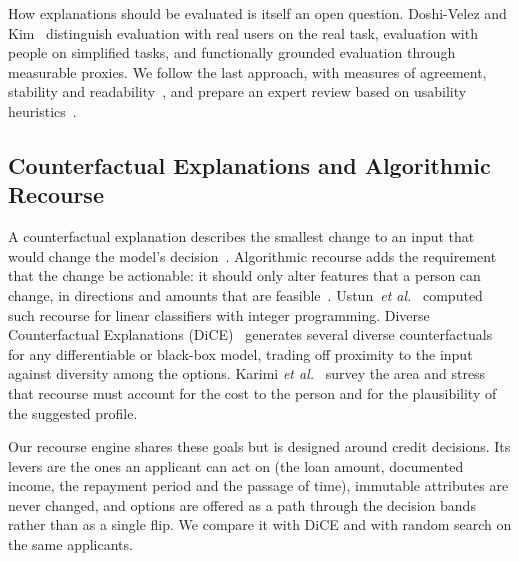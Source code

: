 How explanations should be evaluated is itself an open question. Doshi-Velez and Kim~\cite{doshivelez2017rigorous}
distinguish evaluation with real users on the real task, evaluation with people on simplified tasks, and functionally
grounded evaluation through measurable proxies. We follow the last approach, with measures of agreement, stability
and readability~\cite{flesch1948readability}, and prepare an expert review based on usability
heuristics~\cite{nielsen1994heuristics}.

\subsection{Counterfactual Explanations and Algorithmic Recourse}
A counterfactual explanation describes the smallest change to an input that would change the model's
decision~\cite{wachter2018counterfactual}. Algorithmic recourse adds the requirement that the change be actionable:
it should only alter features that a person can change, in directions and amounts that are
feasible~\cite{ustun2019recourse}. Ustun~\emph{et al.}~\cite{ustun2019recourse} computed such recourse for linear
classifiers with integer programming. Diverse Counterfactual Explanations (DiCE)~\cite{mothilal2020dice} generates several diverse counterfactuals for any
differentiable or black-box model, trading off proximity to the input against diversity among the options. Karimi
\emph{et al.}~\cite{karimi2022survey} survey the area and stress that recourse must account for the cost to the
person and for the plausibility of the suggested profile.

Our recourse engine shares these goals but is designed around credit decisions. Its levers are the ones an applicant
can act on (the loan amount, documented income, the repayment period and the passage of time), immutable attributes
are never changed, and options are offered as a path through the decision bands rather than as a single flip. We
compare it with DiCE and with random search on the same applicants.

